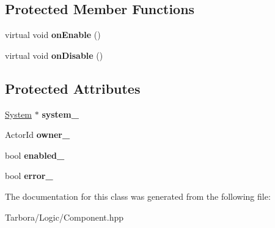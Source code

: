 \subsection*{Protected Member Functions}
\begin{DoxyCompactItemize}
\item 
\mbox{\label{classTarbora_1_1Component_a644061cabaf91ed54eae79ce616c25b9}} 
virtual void {\bfseries on\+Enable} ()
\item 
\mbox{\label{classTarbora_1_1Component_a62150a85e0eb8f3601d211245ca08a2d}} 
virtual void {\bfseries on\+Disable} ()
\end{DoxyCompactItemize}
\subsection*{Protected Attributes}
\begin{DoxyCompactItemize}
\item 
\mbox{\label{classTarbora_1_1Component_a19bde335970f5e3af9bc845122f28f3f}} 
\hyperlink{classTarbora_1_1System}{System} $\ast$ {\bfseries system\+\_\+}
\item 
\mbox{\label{classTarbora_1_1Component_a4c2092ce4a44d193308669024867775c}} 
Actor\+Id {\bfseries owner\+\_\+}
\item 
\mbox{\label{classTarbora_1_1Component_ac5b26f24609f28419cf2a2e6065b17c8}} 
bool {\bfseries enabled\+\_\+}
\item 
\mbox{\label{classTarbora_1_1Component_a7e022fe62bcf3c3781977ca972383c0d}} 
bool {\bfseries error\+\_\+}
\end{DoxyCompactItemize}


The documentation for this class was generated from the following file\+:\begin{DoxyCompactItemize}
\item 
Tarbora/\+Logic/Component.\+hpp\end{DoxyCompactItemize}
